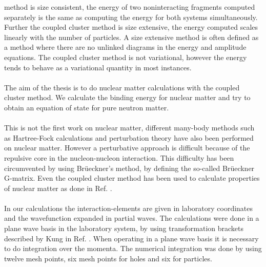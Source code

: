 method is size consistent, the energy of two noninteracting fragments computed separately is the same as computing the energy for both systems simultaneously. Further the coupled cluster method is  size extensive, the energy computed scales linearly with the number of particles. A size extensive method is often defined as a method where there are no unlinked diagrams in the energy and amplitude equations.
The coupled cluster method is not variational, however the energy tends to behave as a variational quantity in most instances.\\
\\
The aim of the thesis is to do nuclear matter calculations with the coupled
cluster method.
We calculate the binding energy for nuclear matter
and try to obtain an equation of state for pure neutron matter.\\
\\
This is not the first work on nuclear matter, different many-body methods such
as Hartree-Fock calculations and perturbation theory have also been performed on
nuclear matter. However a perturbative approach is difficult because of the
repulsive core in the nucleon-nucleon interaction. This difficulty has been
circumvented by using Br\"ueckner's method, by defining the so-called
Br\"ueckner G-matrix.  Even the coupled cluster method has been used to
calculate properties of nuclear matter as done in Ref. \cite{dayzab}.\\
\\
In our calculations the interaction-elements are given
in laboratory coordinates and the wavefunction expanded in partial waves.%
The calculations were done in a plane wave basis in the laboratory system, by
using transformation brackets described by Kung in Ref. \cite{kung}.  When operating in a plane
wave basis it is necessary to do integration over the momenta. The numerical integration was done by using twelve mesh points, six mesh points for holes and six for particles.
